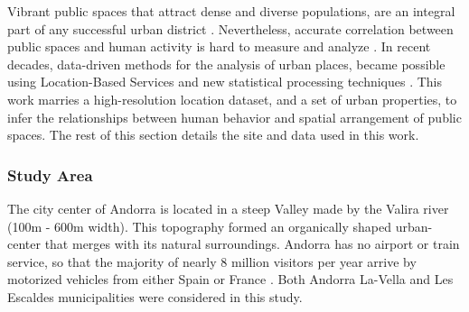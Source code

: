 {
    Vibrant public spaces that attract dense and diverse populations, are an integral part of any successful urban district \cite{krier1979urban, banerjee2011companion, gehl2013study}. Nevertheless, accurate correlation between public spaces and human activity is hard to measure and analyze \cite{gehl2013study, Calabrese2014}. In recent decades, data-driven methods for the analysis of urban places, became possible using Location-Based Services and new statistical processing techniques \cite{Hillier1993}.
    This work marries a high-resolution location dataset, and a set of urban properties, to infer the relationships between human behavior and spatial arrangement of public spaces. The rest of this section details the site and data used in this work.

    \subsubsection{Study Area}
    {
        The city center of Andorra is located in a steep Valley made by the Valira river (100m - 600m width). This topography formed an organically shaped urban-center that merges with its natural surroundings. Andorra has no airport or train service, so that the majority of nearly 8 million visitors per year arrive by motorized vehicles from either Spain or France \cite{CIA}. Both Andorra La-Vella and Les Escaldes municipalities were considered in this study.
    }

}
